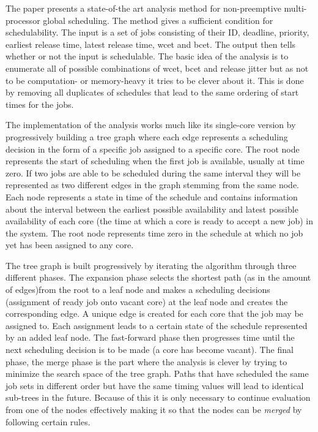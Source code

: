 \documentclass{kththesis}
\begin{document}
The paper \parencite{nasri_response-time_2018} presents a state-of-the art analysis method for
non-preemptive multi-processor global scheduling. The method gives a sufficient condition for
schedulability. The input is a set of jobs consisting of their ID, deadline, priority, earliest
release time, latest release time, \acrshort{wcet} and \acrshort{bcet}. The output then tells
whether or not the input is schedulable. The basic idea of the analysis is to enumerate all of
possible combinations of \acrshort{wcet}, \acrshort{bcet} and release jitter but as not to be
computation- or memory-heavy it tries to be clever about it. This is done by removing all duplicates
of schedules that lead to the same ordering of start times for the jobs.

The implementation of the analysis works much like its single-core version by progressively building
a tree graph where each edge represents a scheduling decision in the form of a specific job assigned
to a specific core. The root node represents the start of scheduling when the first job is
available, usually at time zero. If two jobs are able to be scheduled during the same interval they
will be represented as two different edges in the graph stemming from the same node. Each node
represents a state in time of the schedule and contains information about the interval between the
earliest possible availability and latest possible availability of each core (the time at which a
core is ready to accept a new job) in the system. The root node represents time zero in the schedule
at which no job yet has been assigned to any core. 

The tree graph is built progressively by iterating the algorithm through three different phases.
The expansion phase selects the shortest path (as in the amount of edges)from the root to a leaf
node and makes a scheduling decisions (assignment of ready job onto vacant core) at the leaf node
and creates the corresponding edge. A unique edge is created for each core that the job may be
assigned to. Each assignment leads to a certain state of the schedule represented by an added leaf
node. The fast-forward phase then progresses time until the next scheduling decision is to be made
(a core has become vacant). The final phase, the merge phase is the part where the analysis is
clever by trying to minimize the search space of the tree graph. Paths that have scheduled the same
job sets in different order but have the same timing values will lead to identical sub-trees in the
future. Because of this it is only necessary to continue evaluation from one of the nodes
effectively making it so that the nodes can be \textit{merged} by following certain rules.
\end{document}
